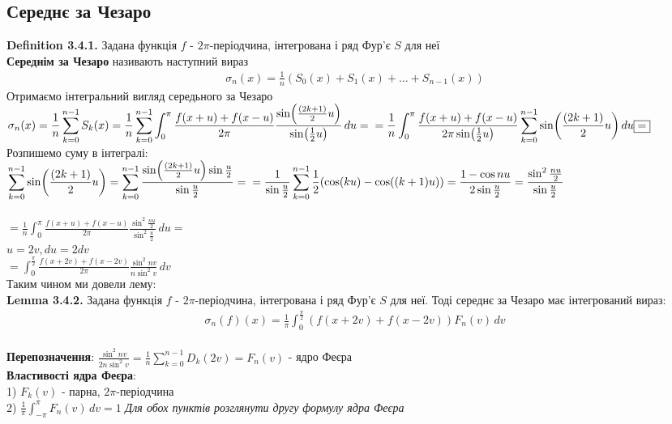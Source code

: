 \documentclass{math_library}
\begin{document}
\subsection{Середнє за Чезаро}
\textbf{Definition 3.4.1.} Задана функція $f$ - $2\pi$-періодчина, інтегрована і ряд Фур'є $S$ для неї\\
\textbf{Середнім за Чезаро} називають наступний вираз
\begin{align*}
\sigma_n(x) = \frac{1}{n} \left( S_0(x) + S_1(x) + \dots + S_{n-1}(x) \right)
\end{align*}
Отримаємо інтегральний вигляд середьного за Чезаро\\
$\displaystyle \sigma_n(x) = \frac{1}{n} \sum_{k=0}^{n-1}S_k(x) = \frac{1}{n} \sum_{k=0}^{n-1} \int_{0}^{\pi} \frac{f(x+u) + f(x-u)}{2\pi} \frac{\sin (\frac{(2k+1)}{2}u)}{\sin (\frac{1}{2}u)} \,du =\\
= \frac{1}{n} \int_0^{\pi} \frac{f(x+u) + f(x-u)}{2\pi \sin (\frac{1}{2}u)}\sum_{k=0}^{n-1}  \sin (\frac{(2k+1)}{2}u) \,du \boxed{=}
$\\
Розпишемо суму в інтегралі:\\
$\displaystyle \sum_{k=0}^{n-1}  \sin (\frac{(2k+1)}{2}u) = \sum_{k=0}^{n-1} \frac{\sin (\frac{(2k+1)}{2}u) \sin \frac{u}{2}}{\sin \frac{u}{2}} = \\ = \frac{1}{\sin \frac{u}{2}}\sum_{k=0}^{n-1} \frac{1}{2} (\cos(ku)-\cos((k+1)u)) = \frac{1-\cos nu}{2\sin \frac{u}{2}} = \frac{\sin^2 \frac{nu}{2}}{\sin \frac{u}{2}}$\\
\\
$\displaystyle \boxed{=} \frac{1}{n} \int_0^{\pi} \frac{f(x+u) + f(x-u)}{2\pi} \frac{\sin^2 \frac{nu}{2}}{\sin^2 \frac{u}{2}} \,du = $\\
$u = 2v, du = 2dv$\\
$\displaystyle = \int_0^{\frac{\pi}{2}} \frac{f(x+2v) + f(x-2v)}{2\pi} \frac{\sin^2 nv}{n \sin^2 v} \,dv$\\
Таким чином ми довели лему:
\bigskip \\
\textbf{Lemma 3.4.2.} Задана функція $f$ - $2\pi$-періодчина, інтегрована і ряд Фур'є $S$ для неї. Тоді середнє за Чезаро має інтегрований вираз:
\begin{align*}
\sigma_n(f)(x) = \frac{1}{\pi}\int_0^{\frac{\pi}{2}} (f(x+2v) + f(x-2v)) F_n(v) \,dv
\end{align*}
\bigskip \\
\textbf{Перепозначення}: $\displaystyle \frac{\sin^2 nv}{2n \sin^2 v} = \frac{1}{n} \sum_{k=0}^{n-1} D_k(2v) = F_n(v)$ - ядро Феєра
\bigskip \\
\textbf{Властивості ядра Феєра}:\\
1) $F_k(v)$ - парна, $2\pi$-періодчина\\
2) $\displaystyle \frac{1}{\pi}\int_{-\pi}^{\pi}F_n(v)\,dv = 1$
\textit{Для обох пунктів розглянути другу формулу ядра Феєра}
\bigskip \\
\end{document}
